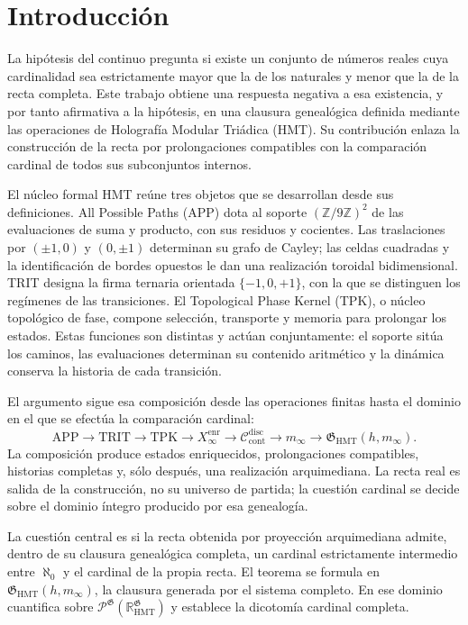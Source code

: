 \section{Introducción}
\label{sec:introduccion-ch}

La hipótesis del continuo pregunta si existe un conjunto de números reales
cuya cardinalidad sea estrictamente mayor que la de los naturales y menor que
la de la recta completa. Este trabajo obtiene una respuesta negativa a esa
existencia, y por tanto afirmativa a la hipótesis, en una clausura genealógica
definida mediante las operaciones de Holografía Modular Triádica (HMT).
Su contribución enlaza la construcción de la recta por prolongaciones
compatibles con la comparación cardinal de todos sus subconjuntos internos.

El núcleo formal HMT reúne tres objetos que se desarrollan desde sus
definiciones. All Possible Paths (APP) dota al soporte
\((\mathbb Z/9\mathbb Z)^2\) de las evaluaciones de suma y producto, con sus
residuos y cocientes. Las traslaciones por \((\pm1,0)\) y \((0,\pm1)\)
determinan su grafo de Cayley; las celdas cuadradas y la identificación de
bordes opuestos le dan una realización toroidal bidimensional. TRIT designa
la firma ternaria orientada \(\{-1,0,+1\}\), con la que se distinguen los
regímenes de las transiciones. El Topological Phase Kernel (TPK), o núcleo
topológico de fase, compone selección, transporte y memoria para prolongar
los estados. Estas funciones son distintas y actúan conjuntamente: el soporte
sitúa los caminos, las evaluaciones determinan su contenido aritmético y la
dinámica conserva la historia de cada transición.

El argumento sigue esa composición desde las operaciones finitas hasta el
dominio en el que se efectúa la comparación cardinal:
\[
 \mathrm{APP}\longrightarrow\mathrm{TRIT}\longrightarrow\mathrm{TPK}
 \longrightarrow X_\infty^{\mathrm{enr}}
 \longrightarrow\mathcal C_{\mathrm{cont}}^{\mathrm{disc}}
 \longrightarrow m_\infty
 \longrightarrow\mathfrak G_{\mathrm{HMT}}(h,m_\infty).
\]
La composición produce estados enriquecidos, prolongaciones compatibles,
historias completas y, sólo después, una realización arquimediana. La recta
real es salida de la construcción, no su universo de partida; la cuestión
cardinal se decide sobre el dominio íntegro producido por esa genealogía.

La cuestión central es si la recta obtenida por proyección arquimediana admite, dentro de
su clausura genealógica completa, un cardinal estrictamente intermedio entre
\(\aleph_0\) y el cardinal de la propia recta. El teorema se formula en
\(\mathfrak G_{\mathrm{HMT}}(h,m_\infty)\), la clausura generada por el sistema
completo. En ese dominio cuantifica sobre
\(\mathcal P^{\mathfrak G}(\mathbb R_{\mathrm{HMT}}^{\mathfrak G})\) y
establece la dicotomía cardinal completa.


